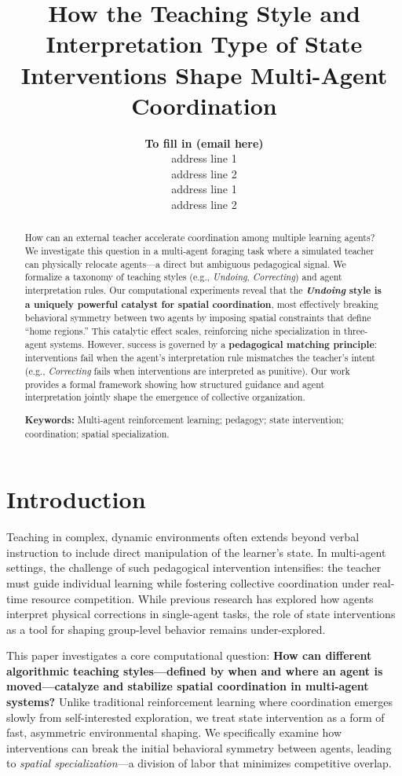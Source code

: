 \documentclass[10pt,letterpaper]{article}
\title{How the Teaching Style and Interpretation Type of State Interventions Shape Multi-Agent Coordination}
\author{{\large \bf To fill in (email here)} \\
  address line 1 \\
  address line 2
  \AND {\large \bf author 2 (email here)} \\
  address line 1 \\
  address line 2}
\begin{document}
\maketitle


\begin{abstract}
How can an external teacher accelerate coordination among multiple learning agents? We investigate this question in a multi-agent foraging task where a simulated teacher can physically relocate agents—a direct but ambiguous pedagogical signal. We formalize a taxonomy of teaching styles (e.g., \emph{Undoing}, \emph{Correcting}) and agent interpretation rules. Our computational experiments reveal that the \textbf{\emph{Undoing} style is a uniquely powerful catalyst for spatial coordination}, most effectively breaking behavioral symmetry between two agents by imposing spatial constraints that define ``home regions.'' This catalytic effect scales, reinforcing niche specialization in three-agent systems. However, success is governed by a \textbf{pedagogical matching principle}: interventions fail when the agent's interpretation rule mismatches the teacher's intent (e.g., \emph{Correcting} fails when interventions are interpreted as punitive). Our work provides a formal framework showing how structured guidance and agent interpretation jointly shape the emergence of collective organization.

\textbf{Keywords:} Multi-agent reinforcement learning; pedagogy; state intervention; coordination; spatial specialization.
\end{abstract}

\section{Introduction}

Teaching in complex, dynamic environments often extends beyond verbal instruction to include direct manipulation of the learner's state. In multi-agent settings, the challenge of such pedagogical intervention intensifies: the teacher must guide individual learning while fostering collective coordination under real-time resource competition. While previous research has explored how agents interpret physical corrections in single-agent tasks, the role of state interventions as a tool for shaping group-level behavior remains under-explored.

This paper investigates a core computational question: \textbf{How can different algorithmic teaching styles---defined by when and where an agent is moved---catalyze and stabilize spatial coordination in multi-agent systems?} Unlike traditional reinforcement learning where coordination emerges slowly from self-interested exploration, we treat state intervention as a form of fast, asymmetric environmental shaping. We specifically examine how interventions can break the initial behavioral symmetry between agents, leading to \textit{spatial specialization}---a division of labor that minimizes competitive overlap.
\end{document}

